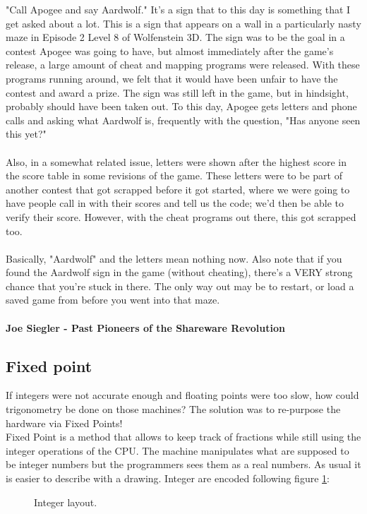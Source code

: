 \documentclass[book.tex]{subfiles}
\begin{document}
\begin{fancyquotes}
"Call Apogee and say Aardwolf."  It's a sign that to this day is something
that I get asked about a lot.  This is a sign that appears on a wall in a
particularly nasty maze in Episode 2 Level 8 of Wolfenstein 3D.  The sign
was to be the goal in a contest Apogee was going to have, but almost
immediately after the game's release, a large amount of cheat and mapping
programs were released.  With these programs running around, we felt that
it would have been unfair to have the contest and award a prize.  The sign
was still left in the game, but in hindsight, probably should have been
taken out.  To this day, Apogee gets letters and phone calls and asking
what Aardwolf is, frequently with the question, "Has anyone seen this yet?"\\
\\
Also, in a somewhat related issue, letters were shown after the highest score
in the score table in some revisions of the game.  These letters were to be
part of another contest that got scrapped before it got started, where we were
going to have people call in with their scores and tell us the code; we'd then
be able to verify their score.  However, with the cheat programs out there,
this got scrapped too.\\
\\
Basically, "Aardwolf" and the letters mean nothing now.  Also note that if
you found the Aardwolf sign in the game (without cheating), there's a VERY
strong chance that you're stuck in there.  The only way out may be to restart,
or load a saved game from before you went into that maze.\\
\\
\textbf{Joe Siegler - Past Pioneers of the Shareware Revolution}
\end{fancyquotes}













\subsection{Fixed point}
If integers were not accurate enough and floating points were too slow, how could trigonometry be done on those machines? The solution was to re-purpose the hardware via Fixed Points!\\
Fixed Point is a method that allows to keep track of fractions while still using the integer operations of the CPU. The machine manipulates what are supposed to be integer numbers but the programmers sees them as a real numbers. As usual it is easier to describe with a drawing. Integer are encoded following figure \ref{fig:int_layout}:
\begin{figure}[H]
\centering
 
 \caption{Integer layout.} \label{fig:int_layout}
 \end{figure}
\end{document}
